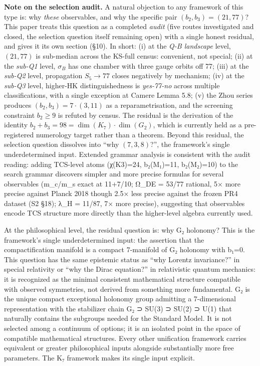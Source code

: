\documentclass[11pt,a4paper]{article}
\begin{document}
\textbf{Note on the selection audit.} A natural objection to any framework of this type is: why \emph{these} observables, and why the specific pair \((b_2, b_3) = (21, 77)\)? This paper treats this question as a completed \emph{audit} (five routes investigated and closed, the selection question itself remaining open) with a single honest residual, and gives it its own section (§10). In short: (i) at the \emph{Q-B landscape} level, \((21, 77)\) is sub-median across the KS-full census: convenient, not special; (ii) at the \emph{sub-Q1} level, \(\sigma_B\) has one chamber with three gauge orbits off 77; (iii) at the \emph{sub-Q2} level, propagation \(S_5 \to 77\) closes negatively by mechanism; (iv) at the \emph{sub-Q3} level, higher-HK distinguishedness is \emph{yes-77-no} across multiple classifications, with a single exception at Camere Lemma 5.8; (v) the Zhou series produces \((b_2, b_3) = 7\cdot(3,11)\) as a reparametrisation, and the screening constraint \(b_2 \ge 9\) is refuted by census. The residual is the derivation of the identity \(b_2 + b_3 = 98 = \dim(K_7) \cdot \dim(G_2)\), which is currently held as a pre-registered numerology target rather than a theorem. Beyond this residual, the selection question dissolves into ``why \((7, 3, 8)\)?'', the framework's single underdetermined input. Extended grammar analysis is consistent with the audit reading: adding TCS-level atoms (χ(K3)=24, b₂(M₁)=11, b₂(M₂)=10) to the search grammar discovers simpler and more precise formulas for several observables (m\_\allowbreak{}c/m\_\allowbreak{}s exact at 11+7/10; Ω\_\allowbreak{}DE = 53/77 rational, 5× more precise against Planck 2018 though 2.5× less precise against the frozen PR4 dataset (S2 §18); λ\_\allowbreak{}H = 11/87, 7× more precise), suggesting that observables encode TCS structure more directly than the higher-level algebra currently used.

At the philosophical level, the residual question is: why G₂ holonomy? This is the framework's single underdetermined input: the assertion that the compactification manifold is a compact 7-manifold of G₂ holonomy with b₁=0. This question has the same epistemic status as ``why Lorentz invariance?'' in special relativity or ``why the Dirac equation?'' in relativistic quantum mechanics: it is recognized as the minimal consistent mathematical structure compatible with observed symmetries, not derived from something more fundamental. G₂ is the unique compact exceptional holonomy group admitting a 7-dimensional representation with the stabilizer chain G₂ ⊃ SU(3) ⊃ SU(2) ⊃ U(1) that naturally contains the subgroups needed for the Standard Model. It is not selected among a continuum of options; it is an isolated point in the space of compatible mathematical structures. Every other unification framework carries equivalent or greater philosophical inputs alongside substantially more free parameters. The K₇ framework makes its single input explicit.
\end{document}
